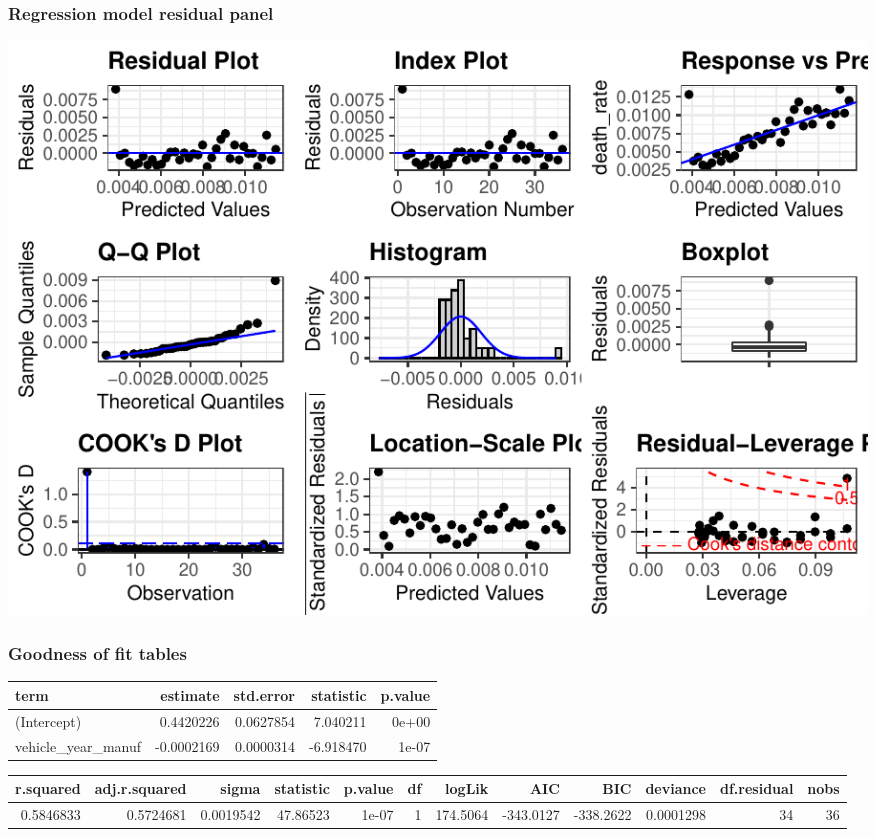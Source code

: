 \documentclass[11pt,a4paper,]{article}
\begin{document}
\subsubsection*{Regression model residual panel}

\includegraphics{Report_files/figure-latex/regression-model-1.pdf}

\subsubsection*{Goodness of fit tables}

\begin{table}
\centering
\begin{tabular}{l|r|r|r|r}
\hline
term & estimate & std.error & statistic & p.value\\
\hline
(Intercept) & 0.4420226 & 0.0627854 & 7.040211 & 0e+00\\
\hline
vehicle\_year\_manuf & -0.0002169 & 0.0000314 & -6.918470 & 1e-07\\
\hline
\end{tabular}
\end{table}

\begin{table}
\centering
\begin{tabular}{r|r|r|r|r|r|r|r|r|r|r|r}
\hline
r.squared & adj.r.squared & sigma & statistic & p.value & df & logLik & AIC & BIC & deviance & df.residual & nobs\\
\hline
0.5846833 & 0.5724681 & 0.0019542 & 47.86523 & 1e-07 & 1 & 174.5064 & -343.0127 & -338.2622 & 0.0001298 & 34 & 36\\
\hline
\end{tabular}
\end{table}
\end{document}
